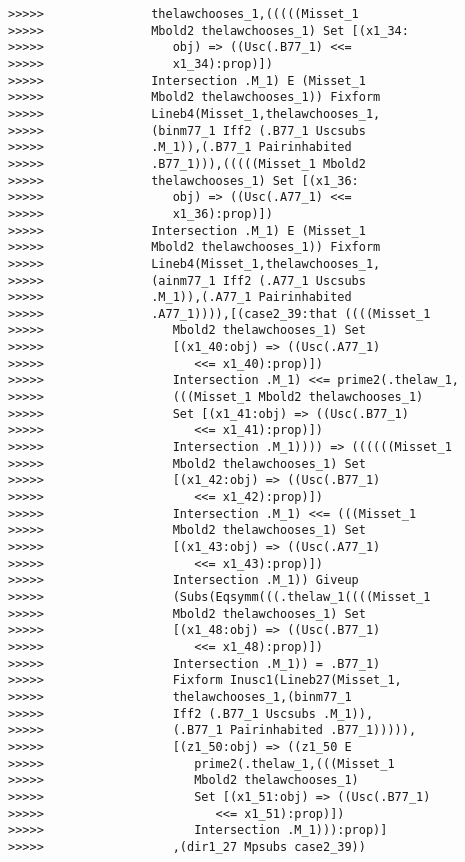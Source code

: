 \documentclass[12pt]{article}
\begin{document}
\begin{verbatim}
>>>>>               thelawchooses_1,(((((Misset_1
>>>>>               Mbold2 thelawchooses_1) Set [(x1_34:
>>>>>                  obj) => ((Usc(.B77_1) <<=
>>>>>                  x1_34):prop)])
>>>>>               Intersection .M_1) E (Misset_1
>>>>>               Mbold2 thelawchooses_1)) Fixform
>>>>>               Lineb4(Misset_1,thelawchooses_1,
>>>>>               (binm77_1 Iff2 (.B77_1 Uscsubs
>>>>>               .M_1)),(.B77_1 Pairinhabited
>>>>>               .B77_1))),(((((Misset_1 Mbold2
>>>>>               thelawchooses_1) Set [(x1_36:
>>>>>                  obj) => ((Usc(.A77_1) <<=
>>>>>                  x1_36):prop)])
>>>>>               Intersection .M_1) E (Misset_1
>>>>>               Mbold2 thelawchooses_1)) Fixform
>>>>>               Lineb4(Misset_1,thelawchooses_1,
>>>>>               (ainm77_1 Iff2 (.A77_1 Uscsubs
>>>>>               .M_1)),(.A77_1 Pairinhabited
>>>>>               .A77_1)))),[(case2_39:that ((((Misset_1
>>>>>                  Mbold2 thelawchooses_1) Set
>>>>>                  [(x1_40:obj) => ((Usc(.A77_1)
>>>>>                     <<= x1_40):prop)])
>>>>>                  Intersection .M_1) <<= prime2(.thelaw_1,
>>>>>                  (((Misset_1 Mbold2 thelawchooses_1)
>>>>>                  Set [(x1_41:obj) => ((Usc(.B77_1)
>>>>>                     <<= x1_41):prop)])
>>>>>                  Intersection .M_1)))) => ((((((Misset_1
>>>>>                  Mbold2 thelawchooses_1) Set
>>>>>                  [(x1_42:obj) => ((Usc(.B77_1)
>>>>>                     <<= x1_42):prop)])
>>>>>                  Intersection .M_1) <<= (((Misset_1
>>>>>                  Mbold2 thelawchooses_1) Set
>>>>>                  [(x1_43:obj) => ((Usc(.A77_1)
>>>>>                     <<= x1_43):prop)])
>>>>>                  Intersection .M_1)) Giveup
>>>>>                  (Subs(Eqsymm(((.thelaw_1((((Misset_1
>>>>>                  Mbold2 thelawchooses_1) Set
>>>>>                  [(x1_48:obj) => ((Usc(.B77_1)
>>>>>                     <<= x1_48):prop)])
>>>>>                  Intersection .M_1)) = .B77_1)
>>>>>                  Fixform Inusc1(Lineb27(Misset_1,
>>>>>                  thelawchooses_1,(binm77_1
>>>>>                  Iff2 (.B77_1 Uscsubs .M_1)),
>>>>>                  (.B77_1 Pairinhabited .B77_1))))),
>>>>>                  [(z1_50:obj) => ((z1_50 E
>>>>>                     prime2(.thelaw_1,(((Misset_1
>>>>>                     Mbold2 thelawchooses_1)
>>>>>                     Set [(x1_51:obj) => ((Usc(.B77_1)
>>>>>                        <<= x1_51):prop)])
>>>>>                     Intersection .M_1))):prop)]
>>>>>                  ,(dir1_27 Mpsubs case2_39))

\end{verbatim}
\end{document}
